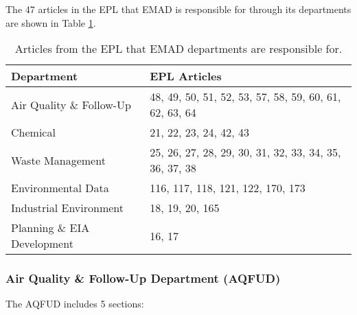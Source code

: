 The 47 articles in the EPL that EMAD is responsible for through its departments are shown in Table \ref{tab:emadarts}.

\begin{table}[!htpb]
\centering
\caption{Articles from the EPL that EMAD departments are responsible for.}
\label{tab:emadarts}
\begin{tabular}{@{}ll@{}}
\toprule
\textbf{Department} & \textbf{EPL Articles} \\ \midrule
Air Quality \& Follow-Up & 48, 49, 50, 51, 52, 53, 57, 58, 59, 60, 61, 62, 63, 64 \\
Chemical & 21, 22, 23, 24, 42, 43 \\
Waste Management & 25, 26, 27, 28, 29, 30, 31, 32, 33, 34, 35, 36, 37, 38 \\
Environmental Data & 116, 117, 118, 121, 122, 170, 173 \\
Industrial Environment & 18, 19, 20, 165 \\
Planning \&  EIA Development & 16, 17 \\ \bottomrule
\end{tabular}
\end{table}

\subsubsection{Air Quality \& Follow-Up Department (AQFUD)}
The AQFUD includes 5 sections:

